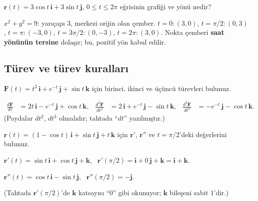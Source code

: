 \begin{soru}
$\mathbf r(t)=3\cos t\,\mathbf i+3\sin t\,\mathbf j$, $0\le t\le2\pi$ eğrisinin grafiği ve yönü nedir?
\end{soru}
\begin{cevap}
$x^2+y^2=9$: yarıçapı $3$, merkezi orijin olan çember. $t=0:(3,0)$, $t=\pi/2:(0,3)$, $t=\pi:(-3,0)$, $t=3\pi/2:(0,-3)$,
$t=2\pi:(3,0)$. Nokta çemberi \textbf{saat yönünün tersine} dolaşır; bu, pozitif yön kabul edilir.
\end{cevap}

\subsection{Türev ve türev kuralları}

\begin{soru}
$\mathbf F(t)=t^2\,\mathbf i+e^{-t}\,\mathbf j+\sin t\,\mathbf k$ için birinci, ikinci ve üçüncü türevleri bulunuz.
\end{soru}
\begin{cevap}
\begin{align*}
\frac{d\mathbf F}{dt}&=2t\,\mathbf i-e^{-t}\,\mathbf j+\cos t\,\mathbf k, &
\frac{d^2\mathbf F}{dt^2}&=2\,\mathbf i+e^{-t}\,\mathbf j-\sin t\,\mathbf k, &
\frac{d^3\mathbf F}{dt^3}&=-e^{-t}\,\mathbf j-\cos t\,\mathbf k .
\end{align*}
(Paydalar $dt^2$, $dt^3$ olmalıdır; tahtada ``$dt$'' yazılmıştır.)
\end{cevap}

\begin{soru}
$\mathbf r(t)=(1-\cos t)\,\mathbf i+\sin t\,\mathbf j+t\,\mathbf k$ için $\mathbf r'$, $\mathbf r''$ ve $t=\pi/2$'deki değerlerini bulunuz.
\end{soru}
\begin{cevap}
$\mathbf r'(t)=\sin t\,\mathbf i+\cos t\,\mathbf j+\mathbf k$, \ $\mathbf r'(\pi/2)=\mathbf i+0\,\mathbf j+\mathbf k=\mathbf i+\mathbf k$.

$\mathbf r''(t)=\cos t\,\mathbf i-\sin t\,\mathbf j$, \ $\mathbf r''(\pi/2)=-\mathbf j$.

(Tahtada $\mathbf r'(\pi/2)$'de $\mathbf k$ katsayısı ``$0$'' gibi okunuyor; $\mathbf k$ bileşeni sabit $1$'dir.)
\end{cevap}

